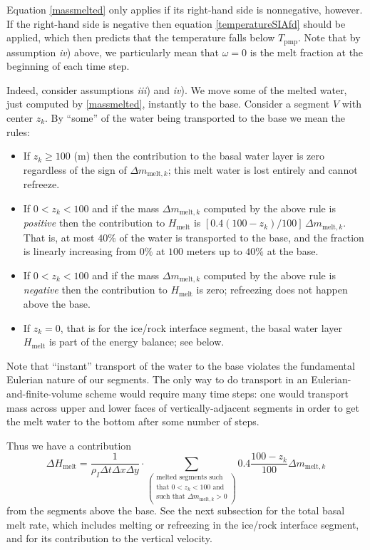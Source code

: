 \documentclass[12pt,final]{amsart}%
\theoremstyle{plain}
\theoremstyle{definition}
\theoremstyle{remark}
\newcommand{\Tpmp}{T_{\text{pmp}}}
\begin{document}
Equation \eqref{massmelted} only applies if its right-hand side is nonnegative, however.  If the right-hand side is negative then equation \eqref{temperatureSIAfd} should be applied, which then predicts that the temperature falls below $\Tpmp$.  Note that by assumption \emph{iv}) above, we particularly mean that $\omega=0$ is the melt fraction at the beginning of each time step.

Indeed, consider assumptions \emph{iii}) and \emph{iv}).  We move some of the melted water, just computed by \eqref{massmelted}, instantly to the base.  Consider a segment $V$ with center $z_k$.  By ``some'' of the water being transported to the base we mean the rules: \begin{itemize}
\item If $z_k \ge 100$ (m) then the contribution to the basal water layer is zero regardless of the sign of $\Delta m_{\text{melt},k}$; this melt water is lost entirely and cannot refreeze.
\item If $0 < z_k < 100$ and if the mass $\Delta m_{\text{melt},k}$ computed by the above rule is \emph{positive} then the contribution to $H_{\text{melt}}$ is $[0.4 (100 - z_k)/ 100]\,\Delta m_{\text{melt},k}$.  That is, at most $40\%$ of the water is transported to the base, and the fraction is linearly increasing from $0\%$ at $100$ meters up to $40\%$ at the base.
\item If $0 < z_k < 100$ and if the mass $\Delta m_{\text{melt},k}$ computed by the above rule is \emph{negative} then the contribution to $H_{\text{melt}}$ is zero; refreezing does not happen above the base.
\item If $z_k=0$, that is for the ice/rock interface segment, the basal water layer $H_{\text{melt}}$ is part of the energy balance; see below.\end{itemize}

Note that ``instant'' transport of the water to the base violates the fundamental Eulerian nature of our segments.  The only way to do transport in an Eulerian-and-finite-volume scheme would require many time steps: one would transport mass across upper and lower faces of vertically-adjacent segments in order to get the melt water to the bottom after some number of steps.

Thus we have a contribution
    $$\Delta H_{\text{melt}} = \frac{1}{\rho_I \Delta t\Delta x \Delta y}\cdot \sum_{\left(\begin{smallmatrix}\text{melted segments such} \\  \text{that }0<z_k<100 \text{ and} \\ \text{such that } \Delta m_{\text{melt},k} > 0\end{smallmatrix}\right)}  0.4 \frac{100 - z_k}{100} \Delta m_{\text{melt},k}$$
from the segments above the base.  See the next subsection for the total basal melt rate, which includes melting or refreezing in the ice/rock interface segment, and for its contribution to the vertical velocity.
\end{document}

